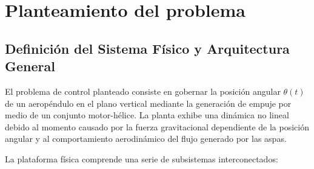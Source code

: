 \section{Planteamiento del problema} 

\subsection{Definición del Sistema Físico y Arquitectura General}
El problema de control planteado consiste en gobernar la posición angular $\theta(t)$ de un aeropéndulo en el plano vertical mediante la generación de empuje por medio de un conjunto motor-hélice. La planta exhibe una dinámica no lineal debido al momento causado por la fuerza gravitacional dependiente de la posición angular y al comportamiento aerodinámico del flujo generado por las aspas.

La plataforma física comprende una serie de subsistemas interconectados:

